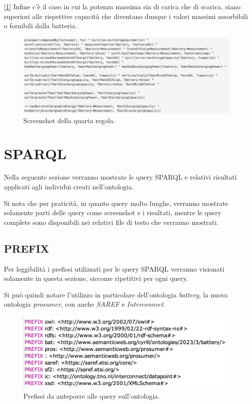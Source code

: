 [\ref*{fig:bothgreater}] Infine c'è il caso in cui la potenza massima sia di carica che di scarica, siano superiori alle rispettive capacità che diventano dunque i valori massimi assorbibili o fornibili dalla batteria.

\begin{figure}[H]
    \centering
    \includegraphics[width=15cm]{images/both >.png}
    \caption{Screenshot della quarta regola.}
    \label{fig:bothgreater}
\end{figure}

\section{SPARQL}\label{sec:sparql}
Nella seguente sezione verranno mostrate le query SPARQL e relativi risultati applicati agli individui creati nell'ontologia.

Si nota che per praticità, in quanto query molto lunghe, verranno mostrate solamente parti delle query come screenshot e i risultati, mentre le query complete sono disponibili nei relativi file di testo che verranno mostrati.


\subsection{PREFIX}
Per leggibilità i prefissi utilizzati per le query SPARQL verranno visionati solamente in questa sezione, siccome ripetitivi per ogni query.

Si può quindi notare l'utilizzo in particolare dell'ontologia \textit{battery}, la nuova ontologia \textit{prosumer}, con anche \textit{SAREF} e \textit{Interconnect}.

\begin{figure}[H]
    \centering
    \includegraphics[width=15cm]{images/prefissi.png}
    \caption{Prefissi da anteporre alle query sull'ontologia.}
    \label{fig:prefix}
\end{figure}

